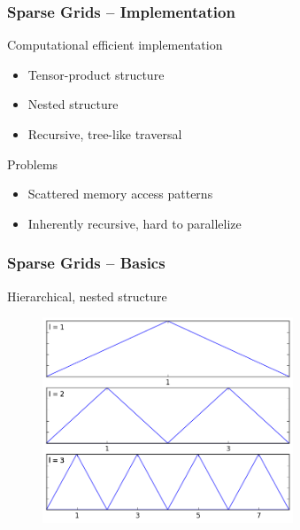 \begin{frame}
  \frametitle{Sparse Grids -- Implementation}
  \topline
  \vspace{-10px}
  \begin{block}{Computational efficient implementation}
    \begin{itemize}
    \item Tensor-product structure
    \item Nested structure
    \item Recursive, tree-like traversal
    \end{itemize}
  \end{block}
  \begin{block}{Problems}
    \begin{itemize}
    \item Scattered memory access patterns
    \item Inherently recursive, hard to parallelize
    \end{itemize}
  \end{block}
\end{frame}


\begin{frame}
  \frametitle{Sparse Grids -- Basics}
  \topline
  \vspace{-10px}
  \begin{block}{Hierarchical, nested structure}
    \begin{figure}[!htp]
      \centering
      \includegraphics[width=7.5cm]{images/sparse_hats}
      \vspace{-12px}
      \caption{}
    \end{figure}
  \end{block}
\end{frame}


